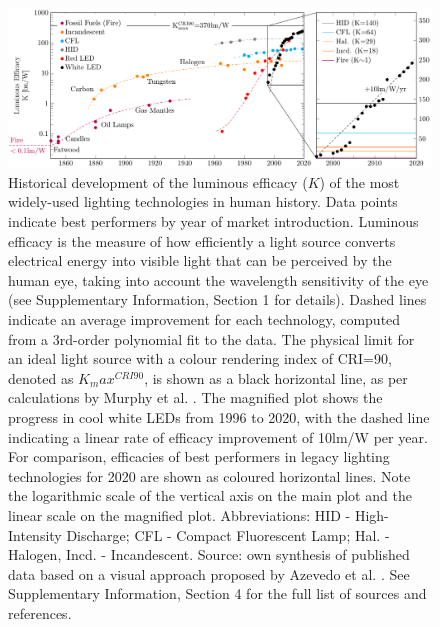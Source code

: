 \documentclass[journal=jacsat,manuscript=article]{achemso}
\begin{document}
\begin{figure}[h!]
 \centering
 \includegraphics[width=\textwidth]{figures/history_efficacy.pdf}
 \caption{Historical development of the luminous efficacy ($K$) of the most widely-used lighting technologies in human history. Data points indicate best performers by year of market introduction. Luminous efficacy is the measure of how efficiently a light source converts electrical energy into visible light that can be perceived by the human eye, taking into account the wavelength sensitivity of the eye (see Supplementary Information, Section 1 for details). Dashed lines indicate an average improvement for each technology, computed from a 3rd-order polynomial fit to the data. The physical limit for an ideal light source with a colour rendering index of CRI=90, denoted as $K_max^{CRI90}$, is shown as a black horizontal line, as per calculations by Murphy et al. \cite{Murphy2012}. The magnified plot shows the progress in cool white LEDs from 1996 to 2020, with the dashed line indicating a linear rate of efficacy improvement of 10lm/W per year. For comparison, efficacies of best performers in legacy lighting technologies for 2020 are shown as coloured horizontal lines. Note the logarithmic scale of the vertical axis on the main plot and the linear scale on the magnified plot. Abbreviations: HID - High-Intensity Discharge; CFL - Compact Fluorescent Lamp; Hal. - Halogen, Incd. - Incandescent. Source: own synthesis of published data based on a visual approach proposed by Azevedo et al. \cite{azevedo2009transition}. See Supplementary Information, Section 4 for the full list of sources and references.}
 \label{fgr:history_efficacy}
\end{figure}
\end{document}
